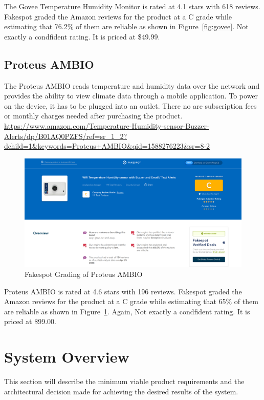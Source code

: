 \documentclass{article}
\begin{document}
The Govee Temperature Humidity Monitor is rated at 4.1 stars with 618 reviews. Fakespot graded the Amazon reviews for the product at a C grade while estimating that 76.2\% of them are reliable as shown in Figure~\ref{fig:govee}. Not exactly a condfident rating. It is priced at \$49.99.

\subsection{Proteus AMBIO}
The Proteus AMBIO reads temperature and humidity data over the network and provides the ability to view climate data through a mobile application. To power on the device, it has to be plugged into an outlet. There no are subscription fees or monthly charges needed after purchasing the product.\\

\url{https://www.amazon.com/Temperature-Humidity-sensor-Buzzer-Alerts/dp/B01AQ0PZFS/ref=sr_1_2?dchild=1&keywords=Proteus+AMBIO&qid=1588276223&sr=8-2}\\

\begin{figure}[H]
	\center
	\includegraphics[width=\textwidth]{images/proteus-fakespot.png}
	\caption{Fakespot Grading of Proteus AMBIO}
	\label{fig:proteus}
\end{figure}

Proteus AMBIO is rated at 4.6 stars with 196 reviews. Fakespot graded the Amazon reviews for the product at a C grade while estimating that 65\% of them are reliable as shown in Figure~\ref{fig:proteus}. Again, Not exactly a condfident rating. It is priced at \$99.00.

\section{System Overview}
\label{section:overview}
This section will describe the minimum viable product requirements and the architectural decision made for achieving the desired results of the system.
\end{document}
